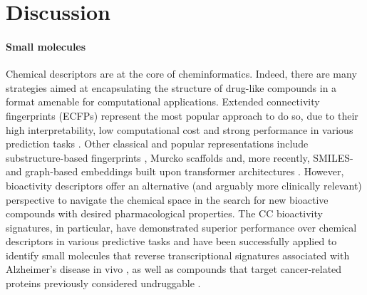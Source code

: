 \chapter{Discussion}
\label{discussion}
\clearpage

\subsubsection{Small molecules}


Chemical descriptors are at the core of cheminformatics. Indeed, there are many strategies aimed at encapsulating the structure of drug-like compounds in a format amenable for computational applications. Extended connectivity fingerprints (ECFPs) represent the most popular approach to do so, due to their high interpretability, low computational cost and strong performance in various prediction tasks \cite{rogers_extended-connectivity_2010}. Other classical and popular representations include substructure-based fingerprints \cite{durant_reoptimization_2002}, Murcko scaffolds \cite{bemis_properties_1996} and, more recently, SMILES- and graph-based embeddings built upon transformer architectures \cite{shin_self-attention_2019, zhou_uni-mol_2022}. However, bioactivity descriptors offer an alternative (and arguably more clinically relevant) perspective to navigate the chemical space in the search for new bioactive compounds with desired pharmacological properties. The CC bioactivity signatures, in particular, have demonstrated superior performance over chemical descriptors in various predictive tasks and have been successfully applied to identify small molecules that reverse transcriptional signatures associated with Alzheimer’s disease in vivo \cite{pauls_identification_2021}, as well as compounds that target cancer-related proteins previously considered undruggable \cite{bertoni_bioactivity_2021}.
